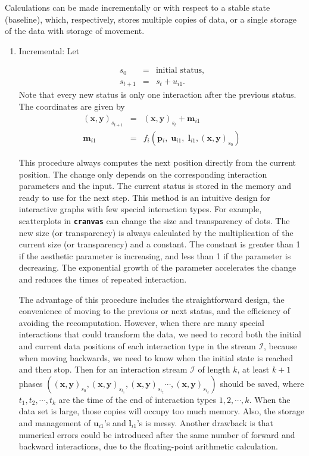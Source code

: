 \documentclass[12pt]{article}
\begin{document}
Calculations can be made incrementally or with respect to a stable state (baseline), which, respectively, stores multiple copies of data, or a single storage of the data with storage of movement.
\begin{enumerate} \itemsep 0in
\item Incremental: Let

\begin{eqnarray*}
s_{0} & = & \textrm{initial status},\\
s_{t+1} & = & s_{t}+u_{i1}.
\end{eqnarray*}
 Note that every new status is only one interaction after the previous
status. The coordinates are given by
\begin{eqnarray*}
 (\mathbf{x},\mathbf{y})_{s_{t+1}} & = &  (\mathbf{x},\mathbf{y})_{s_{t}}+\mathbf{m}{}_{i1}\\
\mathbf{m}{}_{i1} & = & f_{i} (\mathbf{p}{}_{i},\;\mathbf{u}{}_{i1},\;\mathbf{l}_{i1},(\mathbf{x},\mathbf{y})_{s_0})
\end{eqnarray*}

This procedure always computes the next position directly from the
current position. The change only depends on the corresponding interaction
parameters and the input. The current status is stored in the memory
and ready to use for the next step. This method is an intuitive
design for interactive graphs with few special
interaction types. For example, scatterplots in \texttt{\textbf{cranvas}}
can change the size and transparency of dots. The new size (or
transparency) is always calculated by the multiplication of the
current size (or transparency) and a constant. The constant is
greater than 1 if the aesthetic parameter is increasing, and
less than 1 if the parameter is decreasing. The exponential
growth of the parameter accelerates the change and reduces the
times of repeated interaction.

The advantage of this procedure includes the straightforward design,
the convenience of moving to the previous or next status, and the
efficiency of avoiding the recomputation. However,
when there are many special interactions that could transform the
data, we need to record both the initial and current data positions
of each interaction type in the stream $\mathcal{I}$, because
when moving backwards, we need to know when the initial state is
reached and then stop. Then for an interaction stream $\mathcal{I}$
of length $k$, at least $k+1$ phases $ ( (\mathbf{x},\mathbf{y})_{s_{0}}, (\mathbf{x},\mathbf{y})_{s_{t_{1}}}, (\mathbf{x},\mathbf{y})_{s_{t_{2}}}\cdots, (\mathbf{x},\mathbf{y})_{s_{t_{k}}})$
should be saved, where $t_{1},t_{2},\cdots,t_{k}$ are the time of
the end of interaction types $1,2,\cdots,k$. When the data set is
large, those copies will occupy too much memory. Also, the storage
and management of $\mathbf{u}{}_{i1}$'s and $\mathbf{l}_{i1}$'s
is messy. Another drawback is that numerical errors could be
introduced after the same number of forward and backward
interactions, due to the floating-point arithmetic calculation.


\end{enumerate}
\end{document}
